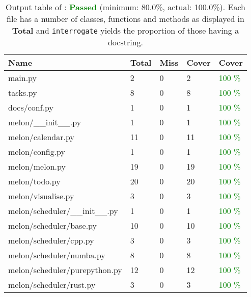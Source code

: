 \begin{table}
  \centering
  \caption{Output table of : \textcolor{green}{\bf Passed} (minimum: 80.0\%, actual: 100.0\%). Each file has a number of classes, functions and methods as displayed in \textbf{Total} and \texttt{interrogate} yields the proportion of those having a docstring.}
  \begin{tabular}{lllll}
    \hline
    \bf Name                        & \bf Total & \bf Miss & \bf Cover & \bf Cover                 \\
    \hline
    main.py                         & 2         & 0        & 2         & \textcolor{green}{100 \%} \\
    tasks.py                        & 8         & 0        & 8         & \textcolor{green}{100 \%} \\
    docs/conf.py                    & 1         & 0        & 1         & \textcolor{green}{100 \%} \\
    melon/\_\_init\_\_.py           & 1         & 0        & 1         & \textcolor{green}{100 \%} \\
    melon/calendar.py               & 11        & 0        & 11        & \textcolor{green}{100 \%} \\
    melon/config.py                 & 1         & 0        & 1         & \textcolor{green}{100 \%} \\
    melon/melon.py                  & 19        & 0        & 19        & \textcolor{green}{100 \%} \\
    melon/todo.py                   & 20        & 0        & 20        & \textcolor{green}{100 \%} \\
    melon/visualise.py              & 3         & 0        & 3         & \textcolor{green}{100 \%} \\
    melon/scheduler/\_\_init\_\_.py & 1         & 0        & 1         & \textcolor{green}{100 \%} \\
    melon/scheduler/base.py         & 10        & 0        & 10        & \textcolor{green}{100 \%} \\
    melon/scheduler/cpp.py          & 3         & 0        & 3         & \textcolor{green}{100 \%} \\
    melon/scheduler/numba.py        & 8         & 0        & 8         & \textcolor{green}{100 \%} \\
    melon/scheduler/purepython.py   & 12        & 0        & 12        & \textcolor{green}{100 \%} \\
    melon/scheduler/rust.py         & 3         & 0        & 3         & \textcolor{green}{100 \%} \\

\end{tabular}
\end{table}
